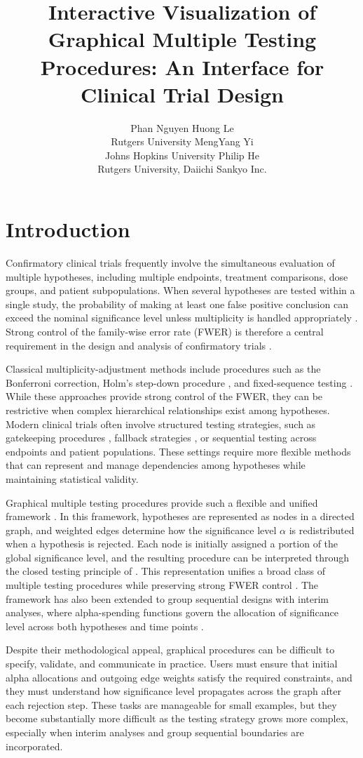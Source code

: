 \documentclass[article]{jss}
\author{
  Phan Nguyen Huong Le\\ Rutgers University \And MengYang Yi\\ Johns Hopkins University \AND Philip He\\ Rutgers University, Daiichi Sankyo Inc.
}
\title{Interactive Visualization of Graphical Multiple Testing Procedures: An \proglang{R} \pkg{shiny} Interface for Clinical Trial Design}
\begin{document}
\section{Introduction}

Confirmatory clinical trials frequently involve the simultaneous evaluation of
multiple hypotheses, including multiple endpoints, treatment comparisons, dose
groups, and patient subpopulations. When several hypotheses are tested within a
single study, the probability of making at least one false positive conclusion
can exceed the nominal significance level unless multiplicity is handled
appropriately \citep{FDA2017,EMA2017}. Strong control of the family-wise error
rate (FWER) is therefore a central requirement in the design and analysis of
confirmatory trials \citep{FDA2017,EMA2017}.

Classical multiplicity-adjustment methods include procedures such as the
Bonferroni correction, Holm's step-down procedure \citep{Holm1979}, and
fixed-sequence testing \citep{Wiens2003}. While these approaches provide strong
control of the FWER, they can be restrictive when complex hierarchical
relationships exist among hypotheses. Modern clinical trials often involve
structured testing strategies, such as gatekeeping procedures
\citep{Dmitrienko2003}, fallback strategies \citep{Wiens2003}, or sequential
testing across endpoints and patient populations. These settings require more
flexible methods that can represent and manage dependencies among hypotheses
while maintaining statistical validity.

Graphical multiple testing procedures provide such a flexible and unified
framework \citep{Bretz2009,Bretz2011}. In this framework, hypotheses are
represented as nodes in a directed graph, and weighted edges determine how the
significance level $\alpha$ is redistributed when a hypothesis is rejected.
Each node is initially assigned a portion of the global significance level, and
the resulting procedure can be interpreted through the closed testing principle
of \citet{Marcus1976}. This representation unifies a broad class of multiple
testing procedures while preserving strong FWER control
\citep{Bretz2009,Bretz2011}. The framework has also been extended to group
sequential designs with interim analyses, where alpha-spending functions
govern the allocation of significance level across both hypotheses and time
points \citep{LanDeMets1983,ProschanLanWittes2006,MaurerBretz2013}.

Despite their methodological appeal, graphical procedures can be difficult to
specify, validate, and communicate in practice. Users must ensure that initial
alpha allocations and outgoing edge weights satisfy the required constraints,
and they must understand how significance level propagates across the graph
after each rejection step. These tasks are manageable for small examples, but
they become substantially more difficult as the testing strategy grows more
complex, especially when interim analyses and group sequential boundaries are
incorporated.
\end{document}
